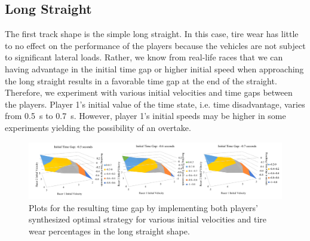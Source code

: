 \subsection{Long Straight}
The first track shape is the simple long straight. In this case, tire wear has little to no effect on the performance of the players because the vehicles are not subject to significant lateral loads. Rather, we know from real-life races that we can having advantage in the initial time gap or higher initial speed when approaching the long straight results in a favorable time gap at the end of the straight. Therefore, we experiment with various initial velocities and time gaps between the players. Player 1's initial value of the time state, i.e. time disadvantage, varies from \SI{0.5}{\second} to \SI{0.7}{\second}. However, player 1's initial speeds may be higher in some experiments yielding the possibility of an overtake.

\begin{figure}[t!]
\includegraphics[width=\textwidth]{Figures/StraightExp.pdf}
    \caption[Results of scenarios in long straight case study.] { Plots for the resulting time gap by implementing both players' synthesized optimal strategy for various initial velocities and tire wear percentages in the long straight shape.}
    \label{fig:ls_exp}
\end{figure}

